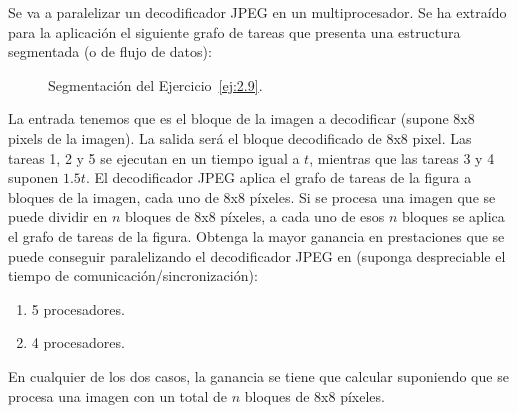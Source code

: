 \begin{ejercicio} \label{ej:2.9}
    Se va a paralelizar un decodificador JPEG en un multiprocesador. Se ha extraído para la aplicación
    el siguiente grafo de tareas que presenta una estructura segmentada (o de flujo de datos):
    \begin{figure}[H]
        \centering
        \caption{Segmentación del Ejercicio~\ref{ej:2.9}.}
    \end{figure}
    La entrada tenemos que es el bloque de la imagen a decodificar (supone 8x8 pixels de la imagen).
    La salida será el bloque decodificado de 8x8 pixel. Las tareas 1, 2 y 5 se ejecutan en un tiempo igual a $t$,
    mientras que las tareas 3 y 4 suponen $1.5t$. El decodificador JPEG aplica el grafo de tareas de la figura a bloques de la imagen, cada uno de 8x8 píxeles. Si
    se procesa una imagen que se puede dividir en $n$ bloques de 8x8 píxeles, a cada uno de esos $n$ bloques se
    aplica el grafo de tareas de la figura. Obtenga la mayor ganancia en prestaciones que se puede conseguir
    paralelizando el decodificador JPEG en (suponga despreciable el tiempo de comunicación/sincronización):
    \begin{enumerate}
        \item 5 procesadores.
        \item 4 procesadores.
    \end{enumerate}

    En cualquier de los dos casos, la ganancia se tiene que calcular suponiendo que se procesa una imagen con un total de $n$ bloques de 8x8 píxeles.



\end{ejercicio}
